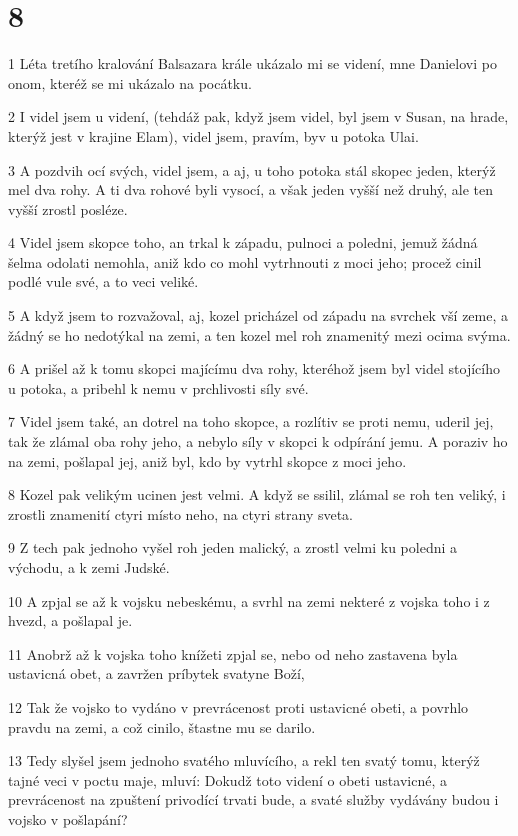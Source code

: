 \chapter{8}

\par 1 Léta tretího kralování Balsazara krále ukázalo mi se videní, mne Danielovi po onom, kteréž se mi ukázalo na pocátku.
\par 2 I videl jsem u videní, (tehdáž pak, když jsem videl, byl jsem v Susan, na hrade, kterýž jest v krajine Elam), videl jsem, pravím, byv u potoka Ulai.
\par 3 A pozdvih ocí svých, videl jsem, a aj, u toho potoka stál skopec jeden, kterýž mel dva rohy. A ti dva rohové byli vysocí, a však jeden vyšší než druhý, ale ten vyšší zrostl posléze.
\par 4 Videl jsem skopce toho, an trkal k západu, pulnoci a poledni, jemuž žádná šelma odolati nemohla, aniž kdo co mohl vytrhnouti z moci jeho; procež cinil podlé vule své, a to veci veliké.
\par 5 A když jsem to rozvažoval, aj, kozel pricházel od západu na svrchek vší zeme, a žádný se ho nedotýkal na zemi, a ten kozel mel roh znamenitý mezi ocima svýma.
\par 6 A prišel až k tomu skopci majícímu dva rohy, kteréhož jsem byl videl stojícího u potoka, a pribehl k nemu v prchlivosti síly své.
\par 7 Videl jsem také, an dotrel na toho skopce, a rozlítiv se proti nemu, uderil jej, tak že zlámal oba rohy jeho, a nebylo síly v skopci k odpírání jemu. A poraziv ho na zemi, pošlapal jej, aniž byl, kdo by vytrhl skopce z moci jeho.
\par 8 Kozel pak velikým ucinen jest velmi. A když se ssilil, zlámal se roh ten veliký, i zrostli znamenití ctyri místo neho, na ctyri strany sveta.
\par 9 Z tech pak jednoho vyšel roh jeden malický, a zrostl velmi ku poledni a východu, a k zemi Judské.
\par 10 A zpjal se až k vojsku nebeskému, a svrhl na zemi nekteré z vojska toho i z hvezd, a pošlapal je.
\par 11 Anobrž až k vojska toho knížeti zpjal se, nebo od neho zastavena byla ustavicná obet, a zavržen príbytek svatyne Boží,
\par 12 Tak že vojsko to vydáno v prevrácenost proti ustavicné obeti, a povrhlo pravdu na zemi, a což cinilo, štastne mu se darilo.
\par 13 Tedy slyšel jsem jednoho svatého mluvícího, a rekl ten svatý tomu, kterýž tajné veci v poctu maje, mluví: Dokudž toto videní o obeti ustavicné, a prevrácenost na zpuštení privodící trvati bude, a svaté služby vydávány budou i vojsko v pošlapání?
